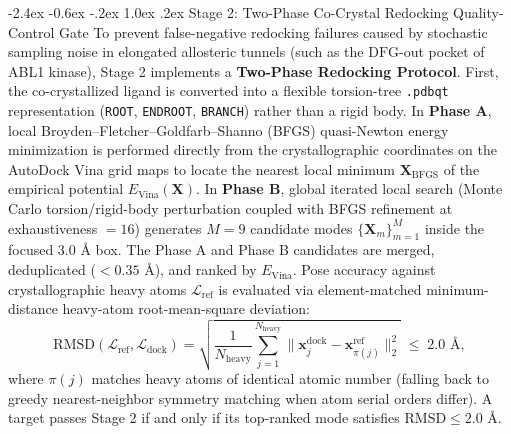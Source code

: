 \documentclass[11pt,a4paper]{article}
\makeatletter
\renewcommand{\subsection}{\@startsection{subsection}{2}{\z@}%
  {-2.4ex \@plus -0.6ex \@minus -.2ex}%
  {1.0ex \@plus .2ex}%
  {\normalfont\large\bfseries\color{primary}}}
\makeatother
\begin{document}
\subsection{Stage 2: Two-Phase Co-Crystal Redocking Quality-Control Gate}
\noindent To prevent false-negative redocking failures caused by stochastic sampling noise in elongated allosteric tunnels (such as the $\text{DFG}$-out pocket of ABL1 kinase), Stage 2 implements a \textbf{Two-Phase Redocking Protocol}. First, the co-crystallized ligand is converted into a flexible torsion-tree \texttt{.pdbqt} representation (\texttt{ROOT}, \texttt{ENDROOT}, \texttt{BRANCH}) rather than a rigid body. In \textbf{Phase A}, local Broyden--Fletcher--Goldfarb--Shanno (BFGS) quasi-Newton energy minimization is performed directly from the crystallographic coordinates on the AutoDock Vina grid maps to locate the nearest local minimum $\mathbf{X}_{\text{BFGS}}$ of the empirical potential $E_{\text{Vina}}(\mathbf{X})$. In \textbf{Phase B}, global iterated local search (Monte Carlo torsion/rigid-body perturbation coupled with BFGS refinement at exhaustiveness $= 16$) generates $M = 9$ candidate modes $\{\mathbf{X}_m\}_{m=1}^{M}$ inside the focused $3.0\text{ \AA}$ box. The Phase A and Phase B candidates are merged, deduplicated ($< 0.35\text{ \AA}$), and ranked by $E_{\text{Vina}}$. Pose accuracy against crystallographic heavy atoms $\mathcal{L}_{\text{ref}}$ is evaluated via element-matched minimum-distance heavy-atom root-mean-square deviation:
\begin{equation}
\text{RMSD}(\mathcal{L}_{\text{ref}}, \mathcal{L}_{\text{dock}}) = \sqrt{\frac{1}{N_{\text{heavy}}} \sum_{j=1}^{N_{\text{heavy}}} \|\mathbf{x}_{j}^{\text{dock}} - \mathbf{x}_{\pi(j)}^{\text{ref}}\|_2^2} \;\le\; 2.0\text{ \AA},
\label{eq:rmsd}
\end{equation}
where $\pi(j)$ matches heavy atoms of identical atomic number (falling back to greedy nearest-neighbor symmetry matching when atom serial orders differ). A target passes Stage 2 if and only if its top-ranked mode satisfies $\text{RMSD} \le 2.0\text{ \AA}$.
\end{document}
